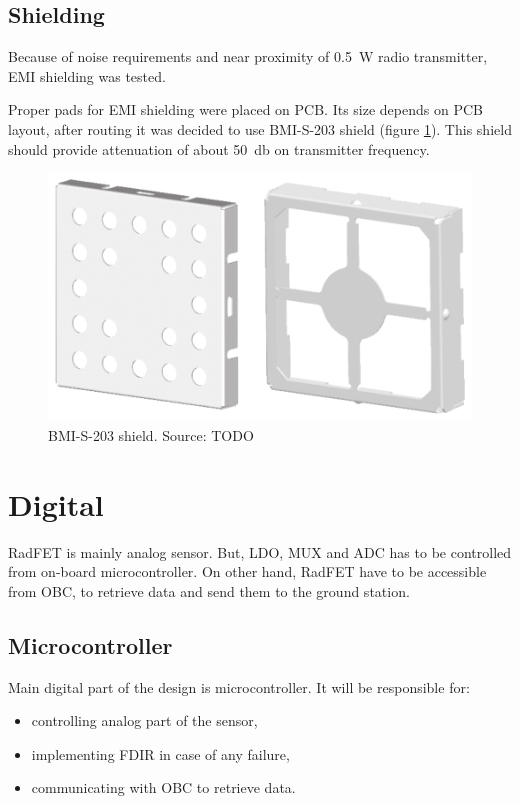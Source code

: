     \subsection{Shielding}
        Because of noise requirements and near proximity of \SI{0.5}{\watt} radio transmitter, EMI shielding was tested.

        Proper pads for EMI shielding were placed on PCB. Its size depends on PCB layout, after routing it was decided to use BMI-S-203 shield (figure \ref{BMI-S-203}). This shield should provide attenuation of about \SI{50}{\decibel} on transmitter frequency.

        \begin{figure}[H]
            \centering
            \includegraphics[width=0.7\paperwidth]{img/06/BMI-S-203.eps}
            \caption{BMI-S-203 shield. Source: TODO}
            \label{BMI-S-203}
        \end{figure}


\section{Digital}
    RadFET is mainly analog sensor. But, LDO, MUX and ADC has to be controlled from on-board microcontroller. On other hand, RadFET have to be accessible from OBC, to retrieve data and send them to the ground station.

    \subsection{Microcontroller}
        Main digital part of the design is microcontroller. It will be responsible for:
        \begin{itemize}
            \item controlling analog part of the sensor,
            \item implementing FDIR in case of any failure,
            \item communicating with OBC to retrieve data.
        \end{itemize}

